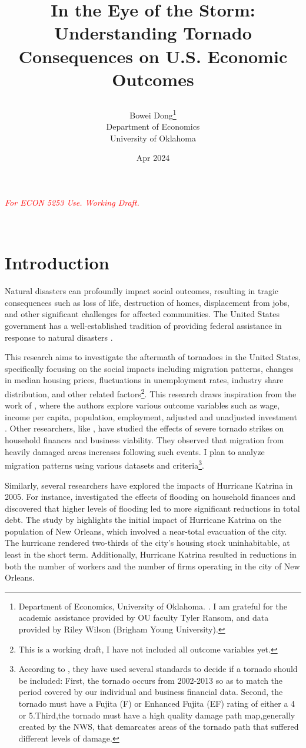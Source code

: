 \documentclass[letterpaper]{article}
\title{\fontsize{22pt}{0pt}\selectfont


In the Eye of the Storm: Understanding Tornado Consequences on U.S. Economic Outcomes}
\author{Bowei Dong\footnote{Department of Economics, University of Oklahoma. \email{boweidon@ou.edu}. I am grateful for the academic assistance provided by OU faculty Tyler Ransom, and data provided by Riley Wilson (Brigham Young University). } \\Department of Economics \\ University of Oklahoma}
\date{Apr 2024}
\begin{document}
\maketitle


 \begin{center}
    

\textcolor{red}{\Large\textit{For ECON 5253 Use. Working Draft.}}
 \end{center}
\
\
\section{Introduction}
Natural disasters can profoundly impact social outcomes, resulting in tragic consequences such as loss of life, destruction of homes, displacement from jobs, and other significant challenges for affected communities. The United States government has a well-established tradition of providing federal assistance in response to natural disasters \parencite[]{FEMA}. 

This research aims to investigate the aftermath of tornadoes in the United States, specifically focusing on the social impacts including migration patterns, changes in median housing prices, fluctuations in unemployment rates, industry share distribution, and other related factors\footnote{This is a working draft, I have not included all outcome variables yet.}. This research draws inspiration from the work of \textcite{bilal2023anticipating}, where the authors explore various outcome variables such as wage, income per capita, population, employment, adjusted and unadjusted investment \parencite{bilal2023anticipating}. Other researchers, like \textcite{gallagher2023weathering}, have studied the effects of severe tornado strikes on household finances and business viability. They observed that migration from heavily damaged areas increases following such events. I plan to analyze migration patterns using various datasets and criteria\footnote{According to \textcite{gallagher2023weathering}, they have used several standards to decide if a tornado should be included: First, the tornado occurs from 2002-2013 so as to match the period covered by our individual and business financial data. Second, the tornado must have a Fujita (F) or Enhanced Fujita (EF) rating of either a 4 or 5.Third,the tornado must have a high quality damage path map,generally created by the NWS, that demarcates areas of the tornado path that suffered different levels of damage.}.

Similarly, several researchers have explored the impacts of Hurricane Katrina in 2005. For instance, \textcite{gallagher2017household} investigated the effects of flooding on household finances and discovered that higher levels of flooding led to more significant reductions in total debt. The study by \textcite{vigdor2008economic} highlights the initial impact of Hurricane Katrina on the population of New Orleans, which involved a near-total evacuation of the city. The hurricane rendered two-thirds of the city's housing stock uninhabitable, at least in the short term. Additionally, Hurricane Katrina resulted in reductions in both the number of workers and the number of firms operating in the city of New Orleans.
\end{document}
